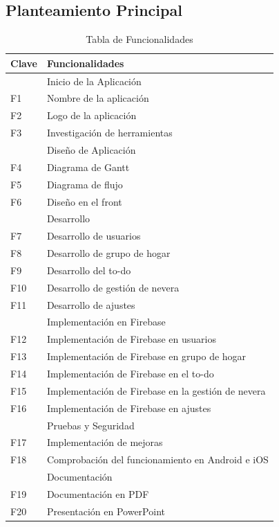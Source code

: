 \documentclass{article}
\begin{document}
\begin{flushleft}
\subsection{Planteamiento Principal}

\begin{table}[H]
\centering
\begin{tabular}{|l|l|}
    \hline
    \textbf{Clave} & \textbf{Funcionalidades} \\ \hline
     & Inicio de la Aplicaci\'on \\ \hline
    F1 & Nombre de la aplicaci\'on \\ \hline
    F2 & Logo de la aplicaci\'on \\ \hline
    F3 & Investigaci\'on de herramientas \\ \hline
     & Dise\~no de Aplicaci\'on \\ \hline
    F4 & Diagrama de Gantt \\ \hline
    F5 & Diagrama de flujo \\ \hline
    F6 & Dise\~no en el front \\ \hline
     & Desarrollo \\ \hline
    F7 & Desarrollo de usuarios \\ \hline
    F8 & Desarrollo de grupo de hogar \\ \hline
    F9 & Desarrollo del to-do \\ \hline
    F10 & Desarrollo de gesti\'on de nevera \\ \hline
    F11 & Desarrollo de ajustes \\ \hline
     & Implementaci\'on en Firebase \\ \hline
    F12 & Implementaci\'on de Firebase en usuarios \\ \hline
    F13 & Implementaci\'on de Firebase en grupo de hogar \\ \hline
    F14 & Implementaci\'on de Firebase en el to-do \\ \hline
    F15 & Implementaci\'on de Firebase en la gesti\'on de nevera \\ \hline
    F16 & Implementaci\'on de Firebase en ajustes \\ \hline
     & Pruebas y Seguridad \\ \hline
    F17 & Implementaci\'on de mejoras \\ \hline
    F18 & Comprobaci\'on del funcionamiento en Android e iOS \\ \hline
     & Documentaci\'on \\ \hline
    F19 & Documentaci\'on en PDF \\ \hline
    F20 & Presentaci\'on en PowerPoint \\ \hline
\end{tabular}
\caption{Tabla de Funcionalidades}
\label{tab:funcionalidades}
\end{table}


\end{flushleft}
\end{document}
